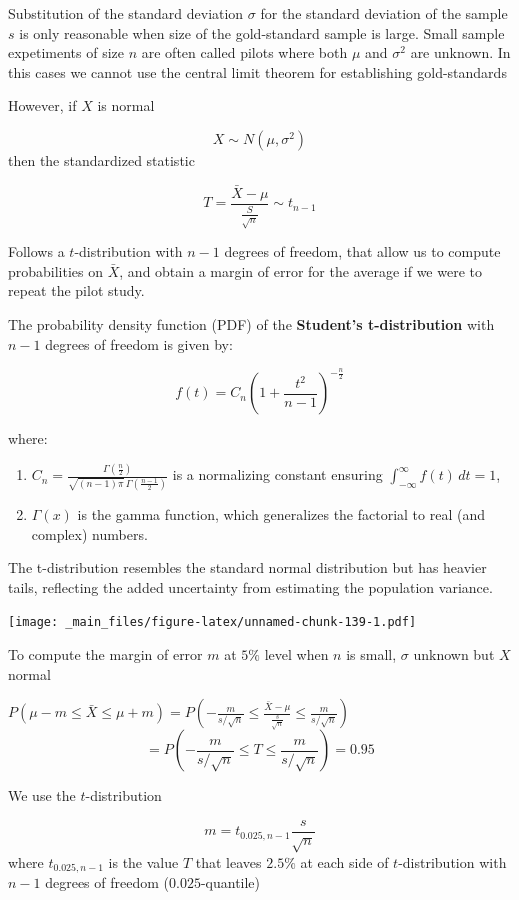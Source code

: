 \documentclass[
]{book}
\providecommand{\tightlist}{%
  \setlength{\itemsep}{0pt}\setlength{\parskip}{0pt}}
\begin{document}
Substitution of the standard deviation \(\sigma\) for the standard deviation of the sample \(s\) is only reasonable when size of the gold-standard sample is large. Small sample expetiments of size \(n\) are often called pilots where both \(\mu\) and \(\sigma^2\) are unknown. In this cases we cannot use the central limit theorem for establishing gold-standards

However, if \(X\) is normal

\[X \sim N(\mu, \sigma^2)\]
then the standardized statistic

\[T=\frac{\bar{X}-\mu}{\frac{S}{\sqrt{n}}} \sim t_{n - 1}\]

Follows a \(t\)-distribution with \(n-1\) degrees of freedom, that allow us to compute probabilities on \(\bar{X}\), and obtain a margin of error for the average if we were to repeat the pilot study.

The probability density function (PDF) of the \textbf{Student's t-distribution} with \(n - 1\) degrees of freedom is given by:

\[
f(t) = C_n \left(1 + \frac{t^2}{n - 1}\right)^{-\frac{n}{2}}
\]

where:

\begin{enumerate}
\def\labelenumi{\arabic{enumi}.}
\tightlist
\item
  \(C_n = \frac{\Gamma\left(\frac{n}{2}\right)}{\sqrt{(n - 1)\pi} \, \Gamma\left(\frac{n - 1}{2}\right)}\) is a normalizing constant ensuring \(\int_{-\infty}^{\infty} f(t) \, dt = 1\),
\item
  \(\Gamma(x)\) is the gamma function, which generalizes the factorial to real (and complex) numbers.
\end{enumerate}

The t-distribution resembles the standard normal distribution but has heavier tails, reflecting the added uncertainty from estimating the population variance.

\texttt{[image: \_main\_files/figure-latex/unnamed-chunk-139-1.pdf]}

To compute the margin of error \(m\) at \(5\%\) level when \(n\) is small, \(\sigma\) unknown but \(X\) normal

\(P(\mu-m \leq \bar{X} \leq\mu + m)=P(-\frac{m}{s/\sqrt{n}} \leq \frac{\bar{X}-\mu}{\frac{s}{\sqrt{n}}} \leq\frac{m}{s/\sqrt{n}})\)
\[=P(-\frac{m}{s/\sqrt{n}} \leq T \leq\frac{m}{s/\sqrt{n}})=0.95\]

We use the \(t\)-distribution

\[m=t_{0.025, n-1} \frac{s}{\sqrt{n}}\]
where \(t_{0.025, n-1}\) is the value \(T\) that leaves \(2.5\%\) at each side of \(t\)-distribution with \(n-1\) degrees of freedom (\(0.025\)-quantile)
\end{document}
